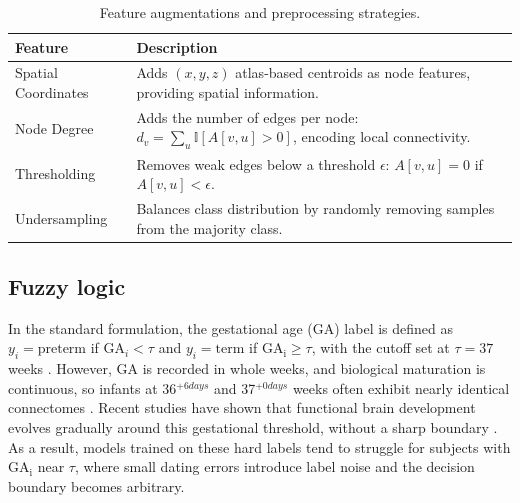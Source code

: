 \documentclass[doubleblind]{ecai}
\begin{document}
\begin{table}[htbp]
\centering
\vspace{0.125cm}
\caption{Feature augmentations and preprocessing strategies.}

\setlength{\tabcolsep}{4pt}  
\begin{tabular}{@{}p{2.6cm}p{5.6cm}@{}}
\toprule
\textbf{Feature} & \textbf{Description} \\
\midrule
Spatial Coordinates & Adds $(x, y, z)$ atlas-based centroids as node features, providing spatial information. \\
Node Degree & Adds the number of edges per node: $d_v = \sum_u \mathbb{I}[A[v,u] > 0]$, encoding local connectivity. \\
Thresholding & Removes weak edges below a threshold $\epsilon$: $A[v,u] = 0$ if $A[v,u] < \epsilon$. \\
Undersampling & Balances class distribution by randomly removing samples from the majority class. \\
\bottomrule
\end{tabular}
\label{tab:augmentation_strategies}
\end{table}












\subsection{Fuzzy logic}\label{fuzzylogic}

In the standard formulation, the gestational age (GA) label is defined as $y_i = \text{preterm}$ if $\mathrm{GA}_i < \tau$ and $y_i = \text{term}$ if $\mathrm{GA_i} \geq \tau$, with the cutoff set at $\tau = 37$ weeks \cite{quinn2016preterm}. However, GA is recorded in whole weeks, and biological maturation is continuous, so infants at 36$^{+6 days}$ and 37$^{+0 days}$ weeks often exhibit nearly identical connectomes \cite{jukic2013length}. Recent studies have shown that functional brain development evolves gradually around this gestational threshold, without a sharp boundary \citep{hou2024sensitivity}. As a result, models trained on these hard labels tend to struggle for subjects with $\mathrm{GA_i}$ near $\tau$, where small dating errors introduce label noise and the decision boundary becomes arbitrary. 
\end{document}
